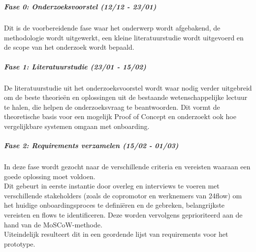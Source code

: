 
\chapter{}%
\label{ch:methodologie}

\paragraph{Fase 0: Onderzoeksvoorstel (12/12 - 23/01)}

Dit is de voorbereidende fase waar het onderwerp wordt afgebakend, de methodologie wordt uitgewerkt, een kleine literatuurstudie wordt uitgevoerd en de scope van het onderzoek wordt bepaald.

\paragraph{Fase 1: Literatuurstudie (23/01 - 15/02)}     
De literatuurstudie uit het onderzoeksvoorstel wordt waar nodig verder uitgebreid om de beste theorieën en oplossingen uit de bestaande wetenschappelijke lectuur te halen, die helpen de onderzoeksvraag te beantwoorden. Dit vormt de theoretische basis voor een mogelijk Proof of Concept en onderzoekt ook hoe vergelijkbare systemen omgaan met onboarding. 

\paragraph{Fase 2: Requirements verzamelen (15/02 - 01/03)}

In deze fase wordt gezocht naar de verschillende criteria en vereisten waaraan een goede oplossing moet voldoen. 
\\

Dit gebeurt in eerste instantie door overleg en interviews te voeren met verschillende stakeholders (zoals de copromotor en werknemers van 24flow) om het huidige onboardingsproces te definiëren en de gebreken, belangrijkste vereisten en flows te identificeren. Deze worden vervolgens geprioriteerd aan de hand van de MoSCoW-methode. 
\\

Uiteindelijk resulteert dit in een geordende lijst van requirements voor het prototype.
\\


